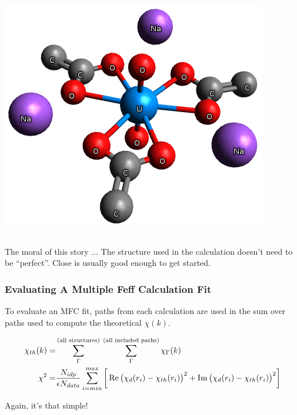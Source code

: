 \documentclass[10pt, xcolor=x11names, compress]{beamer}
\begin{document}
\begin{frame}
\begin{columns}[T]
\begin{column}{0.5\linewidth}
\begin{center}
        \includegraphics[width=0.5\linewidth]{mfc/NaU_triacetate.png}
      \end{center}
    \end{column}
  \end{columns}
  \begin{block}{The moral of this story ...}
    The structure used in the {\feff} calculation doesn't need to be
    ``perfect''.  Close is usually good enough to get started.
  \end{block}
\end{frame}

\begin{frame}
  \frametitle{Evaluating A Multiple Feff Calculation Fit}

  To evaluate an MFC fit, paths from each {\feff} calculation are used
  in the sum over paths used to compute the theoretical $\chi(k)$.
  
  {\small
    \begin{align}
      \chi_{th}(k) =& \sum\limits_\Gamma^{\textrm{(all structures)}} \>
      \sum\limits_\Gamma^{\textrm{(all included paths)}}\chi_\Gamma(k)
      \notag \\
      \chi^2      =& \frac{N_{idp}}{\epsilon N_{data}}
                     \sum\limits_{i=min}^{max} 
                       \bigg[\Re\big(\chi_d(r_i)-\chi_{th}(r_i)\big)^2 + 
                             \Im\big(\chi_d(r_i)-\chi_{th}(r_i)\big)^2\bigg]
                     \notag
    \end{align}}

  \begin{exampleblock}{}
    \begin{center}
      Again, it's that simple!
    \end{center}
  \end{exampleblock}
\end{frame}
\end{document}
